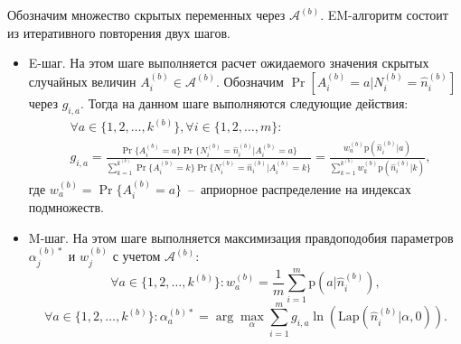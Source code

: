 Обозначим множество скрытых переменных через $\mathcal{A}^{(b)}$. EM-алгоритм состоит из итеративного повторения двух шагов.
\begin{itemize}
    \item E-шаг. На этом шаге выполняется расчет ожидаемого значения скрытых случайных величин $A_i^{(b)} \in \mathcal{A}^{(b)}$. Обозначим $\Pr[A_i^{(b)} = a \vert N_i^{(b)} = \hat{n}_i^{(b)}]$ через $g_{i,a}$. Тогда на данном шаге выполняются следующие действия:
    \begin{equation}
        \begin{split}
            & \forall a \in \{1,2,\ldots,k^{(b)}\}, \forall i \in \{1,2,\ldots,m\} : 
            \\
            & g_{i,a} = 
            \frac{\Pr\{A_i^{(b)} = a\} \Pr\{N_i^{(b)} = \hat{n}_i^{(b)} \vert A_i^{(b)} = a \}} {\sum\limits_{k=1}^{k^{(b)}} \Pr\{A_i^{(b)} = k\} \Pr\{N_i^{(b)} = \hat{n}_i^{(b)} \vert A_i^{(b)} = k \}} = \frac{w_a^{(b)} \mathrm{p}(\hat{n}_i^{(b)}\vert a)} {\sum\limits_{k=1}^{k^{(b)}} w_k^{(b)} \mathrm{p}(\hat{n}_i^{(b)}\vert k) },
        \end{split}
        \label{eq:EStep}
    \end{equation}
    где $w_a^{(b)} = \Pr\{A_i^{(b)} = a\}$~--~априорное распределение на индексах подмножеств.
    \item M-шаг. На этом шаге выполняется максимизация правдоподобия параметров $\alpha_j^{(b)*}$ и $w_j^{(b)}$ с учетом $\mathcal{A}^{(b)}$:
    \begin{equation}
        \forall a \in \{1,2,\ldots,k^{(b)}\} : w_a^{(b)} = \frac{1}{m} \sum\limits_{i=1}^{m} \mathrm{p}(a \vert \hat{n}_i^{(b)}),
        \label{eq:MStep_w}
    \end{equation}
    \begin{equation}
        \forall a \in \{1,2,\ldots,k^{(b)}\} : \alpha_a^{(b)*} = \arg\max_{\alpha} \sum\limits_{i=1}^{m} g_{i,a} \ln\left(\mathrm{Lap}(\hat{n}_i^{(b)} \vert \alpha, 0)\right).
        \label{eq:MStep_theta}
    \end{equation}
\end{itemize}

